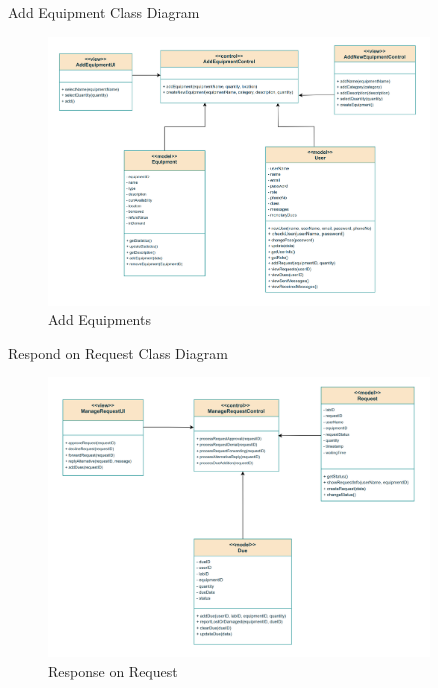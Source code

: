 \documentclass[20pt]{beamer}
\numberwithin{figure}{section}
\begin{document}
\begin{frame}{Add Equipment Class Diagram}

     \begin{figure}
        \centering
        \includegraphics[width= 0.9\textwidth , height= 0.8\paperheight]{AddEquipmentsUML.png}
        \caption{{Add Equipments}}
        \label{fig:9}
    \end{figure}

\end{frame}

\begin{frame}{Respond on Request Class Diagram}

     \begin{figure}
        \centering
        \includegraphics[width= 0.9\textwidth , height= 0.8\paperheight]{ResponseRequestsUML.png}
        \caption{{Response on Request}}
        \label{fig:10}
    \end{figure}

\end{frame}
\end{document}

